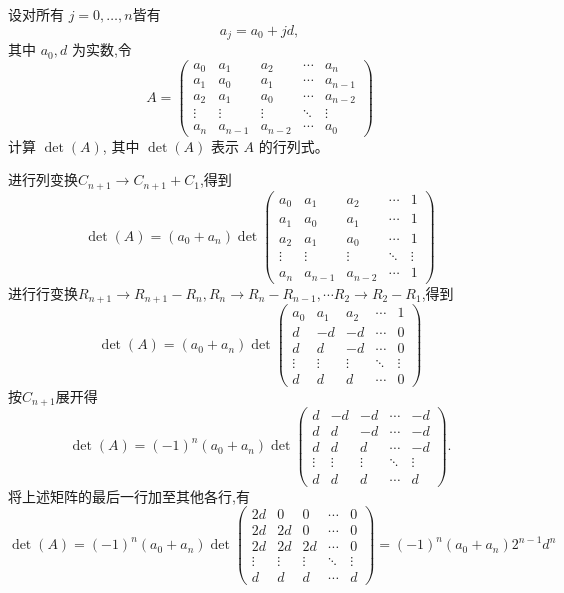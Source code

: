 \begin{questions}
    \question 设对所有 $j=0,\dots,n$皆有 
    \[
    a_j = a_0 + jd,
    \]
    其中 $a_0, d$ 为实数,令
    \[
    A = \begin{pmatrix}
    a_0 & a_1 & a_2 & \cdots & a_n \\
    a_1 & a_0 & a_1 & \cdots & a_{n-1} \\
    a_2 & a_1 & a_0 & \cdots & a_{n-2} \\
    \vdots & \vdots & \vdots & \ddots & \vdots \\
    a_n & a_{n-1} & a_{n-2} & \cdots & a_0
    \end{pmatrix}
    \]
    计算 $\det(A)$, 其中 $\det(A)$ 表示 $A$ 的行列式。
    \begin{solution}
        进行列变换$C_{n+1} \to C_{n+1} + C_1$,得到
        \[
        \det(A) = (a_0 + a_n) \det \begin{pmatrix}
        a_0 & a_1 & a_2 & \cdots & 1 \\
        a_1 & a_0 & a_1 & \cdots & 1 \\
        a_2 & a_1 & a_0 & \cdots & 1 \\
        \vdots & \vdots & \vdots & \ddots & \vdots \\
        a_n & a_{n-1} & a_{n-2} & \cdots & 1
        \end{pmatrix}
        \]
        进行行变换$R_{n+1} \to R_{n+1} -R_n,R_n \to R_n -R_{n-1}, \cdots R_2 \to R_2-R_1$,得到
        \[
        \det(A) = (a_0 + a_n) \det \begin{pmatrix}
        a_0 & a_1 & a_2 & \cdots & 1 \\
        d & -d & -d & \cdots & 0 \\
        d & d & -d & \cdots & 0 \\
        \vdots & \vdots & \vdots & \ddots & \vdots \\
        d & d & d & \cdots & 0
        \end{pmatrix}
        \]
        按$C_{n+1}$展开得
        \[
        \det(A) = (-1)^n (a_0 + a_n) \det \begin{pmatrix}
        d & -d & -d & \cdots & -d \\
        d & d & -d & \cdots & -d \\
        d & d & d & \cdots & -d \\
        \vdots & \vdots & \vdots & \ddots & \vdots \\
        d & d & d & \cdots & d
        \end{pmatrix}.
        \]
        将上述矩阵的最后一行加至其他各行,有
        \[
        \det(A) = (-1)^n (a_0 + a_n) \det \begin{pmatrix}
        2d & 0 & 0 & \cdots & 0 \\
        2d & 2d & 0 & \cdots & 0 \\
        2d & 2d & 2d & \cdots & 0 \\
        \vdots & \vdots & \vdots & \ddots & \vdots \\
        d & d & d & \cdots & d
        \end{pmatrix} = (-1)^n (a_0 + a_n) 2^{n-1} d^n
        \]
    \end{solution}
    

\end{questions}
